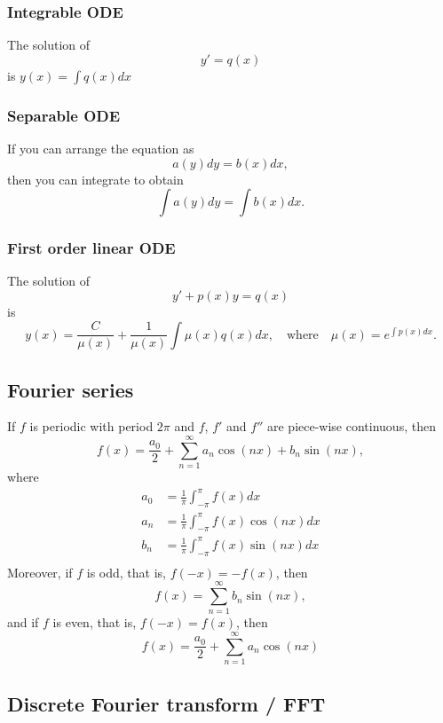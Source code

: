 \documentclass[12pt]{article}
\begin{document}
\subsubsection*{Integrable ODE}
The solution of
$$
y'=q(x)
$$
is $y(x)=\int q(x)dx$

\subsubsection*{Separable ODE}
If you can arrange the equation as $$a(y)dy=b(x)dx,$$
then you can integrate to obtain $$\int a(y)dy=\int b(x)dx.$$

\subsubsection*{First order linear ODE}
The solution of
$$
y'+p(x)y=q(x)
$$
is
$$
y(x)=\frac{C}{\mu(x)}+\frac{1}{\mu(x)}\int \mu(x)q(x)dx,\quad\textrm{where}\quad
\mu(x)=e^{\int p(x)dx}.
$$

\newpage
\subsection*{Fourier series}

If $f$ is periodic with period $2\pi$ and $f$, $f'$ and $f''$ are piece-wise continuous, then
$$
f(x)
=\frac{a_0}{2}
+\sum_{n=1}^\infty a_n\cos(nx)+b_n\sin(nx),
$$
where
\begin{equation*}
\begin{split}
a_0&=\frac{1}{\pi}\int_{-\pi}^{\pi}
f(x)dx\\
a_n&=\frac{1}{\pi}\int_{-\pi}^{\pi}
f(x)\cos(nx)dx\\
b_n&=\frac{1}{\pi}\int_{-\pi}^{\pi}
f(x)\sin(nx)dx\\
\end{split}
\end{equation*}
Moreover, if $f$ is odd, that is, $f(-x)=-f(x)$,
then
$$
f(x)
=\sum_{n=1}^\infty b_n\sin(nx),
$$
and if $f$ is even, that is, $f(-x)=f(x)$, then
$$
f(x)
=\frac{a_0}{2}
+\sum_{n=1}^\infty a_n\cos(nx)
$$

\subsection*{Discrete Fourier transform / FFT}
\end{document}
